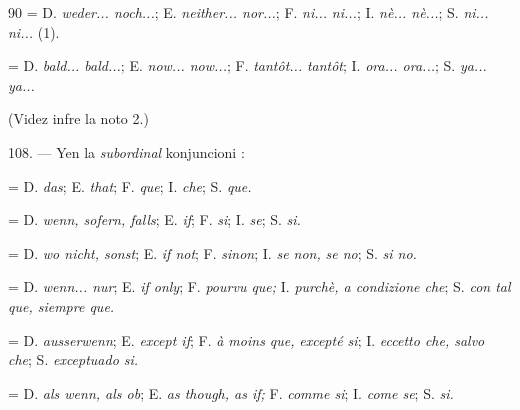 \begin{VUpage}[94]{90}
 = D. \textit{weder... noch...}; E. \textit{neither... nor...}; F. \textit{ni...}\nl
\textit{ni...}; I. \textit{nè... nè...}; S. \textit{ni... ni...} (1).

 = D. \textit{bald... bald...}; E. \textit{now... now...}; F. \textit{tantôt...}\nl
\textit{tantôt}; I. \textit{ora... ora...}; S. \textit{ya... ya...}

 (Videz infre la noto 2.)

\VUblanc{5.64pt}%
108. --- Yen la \textit{subordinal} konjuncioni :

\VUblancAlinea
{} = D. \textit{das}; E. \textit{that}; F. \textit{que}; I. \textit{che}; S. \textit{que.}

 = D. \textit{wenn, sofern, falls}; E. \textit{if}; F. \textit{si}; I. \textit{se}; S. \textit{si.}

 = D. \textit{wo nicht, sonst}; E. \textit{if not}; F. \textit{sinon}; I. \textit{se non,}\nl
\textit{se no}; S. \textit{si no.}

 = D. \textit{wenn... nur}; E. \textit{if only}; F. \textit{pourvu que;}\nl
I. \textit{purchè, a condizione che}; S. \textit{con tal que, siempre que.}

 = D. \textit{ausserwenn}; E. \textit{except if}; F. \textit{à moins que,}\nl
\textit{excepté si}; I. \textit{eccetto che, salvo che}; S. \textit{exceptuado si.}

 = D. \textit{als wenn, als ob}; E. \textit{as though, as if;}\nl
F. \textit{comme si}; I. \textit{come se}; S. \textit{ si.}
\end{VUpage}

